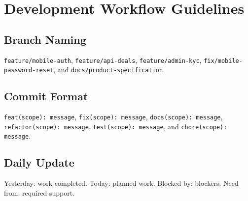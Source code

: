 \chapter{Development Workflow Guidelines}
\section{Branch Naming}
\texttt{feature/mobile-auth}, \texttt{feature/api-deals}, \texttt{feature/admin-kyc}, \texttt{fix/mobile-password-reset}, and \texttt{docs/product-specification}.
\section{Commit Format}
\texttt{feat(scope): message}, \texttt{fix(scope): message}, \texttt{docs(scope): message}, \texttt{refactor(scope): message}, \texttt{test(scope): message}, and \texttt{chore(scope): message}.
\section{Daily Update}
Yesterday: work completed. Today: planned work. Blocked by: blockers. Need from: required support.
